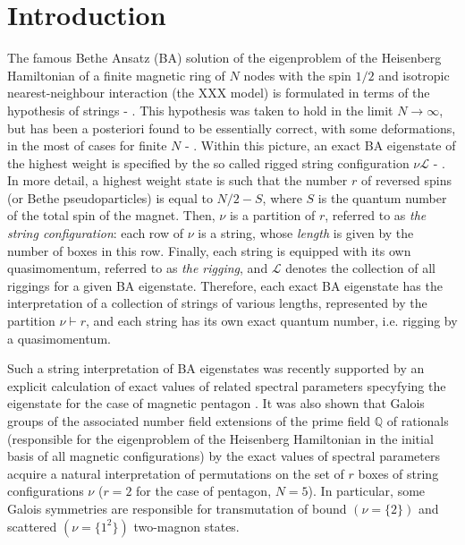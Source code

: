 \documentclass{elsarticle}
\begin{document}
\section{Introduction}
The famous Bethe Ansatz (BA) solution \cite{bethe} of the eigenproblem of the Heisenberg Hamiltonian of a finite magnetic ring of $N$ nodes with the spin $1/2$ and isotropic nearest-neighbour interaction (the XXX model) is formulated in terms of the hypothesis of strings \cite{bethe} - \cite{yangone}. This hypothesis was taken to hold in the limit $N\to \infty$, but has been a posteriori found to be essentially correct, with some deformations, in the most of cases for finite $N$ \cite{yangone} - \cite{hage}. Within this picture, an exact BA eigenstate of the highest weight is specified by the so called rigged string configuration $\nu\mathcal{L}$ \cite{kkr} - \cite{llls}. In more detail, a highest weight state is such that the number $r$ of reversed spins (or Bethe pseudoparticles) is equal to $N/2-S$, where $S$ is the quantum number of the total spin of the magnet. Then, $\nu$ is a partition of $r$, referred to as {\em the string configuration}: each row of $\nu$ is a string, whose {\em length} is given by the number of boxes in this row. Finally, each string is equipped with its own quasimomentum, referred to as {\em the rigging}, and $\mathcal{L}$ denotes the collection of all riggings for a given BA eigenstate. Therefore, each exact BA eigenstate has the interpretation of a collection of strings of various lengths, represented by the partition $\nu \vdash r$, and each string has its own exact quantum number, i.e. rigging by a quasimomentum. 

Such a string interpretation of BA eigenstates was recently supported by an explicit calculation of exact values of related spectral parameters specyfying the eigenstate for the case of magnetic pentagon \cite{mbll}. It was also shown that Galois groups of the associated number field extensions of the prime field $\mathbb{Q}$ of rationals (responsible for the eigenproblem of the Heisenberg Hamiltonian in the initial basis of all magnetic configurations) by the exact values of spectral parameters acquire a natural interpretation of permutations on the set of $r$ boxes of string configurations $\nu$ ($r=2$ for the case of pentagon, $N=5$). In particular, some Galois symmetries are responsible for transmutation of bound $(\nu=\{2\})$ and scattered  $(\nu=\{1^2\})$ two-magnon states. 
\end{document}

